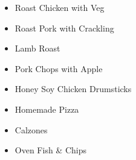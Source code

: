 \begin{itemize}
  \item \todo Roast Chicken with Veg
  \item \todo Roast Pork with Crackling
  \item \todo Lamb Roast
  \item \todo Pork Chops with Apple
  \item \todo Honey Soy Chicken Drumsticks
  \item \todo Homemade Pizza
  \item \todo Calzones
  \item \todo Oven Fish \& Chips
\end{itemize}
